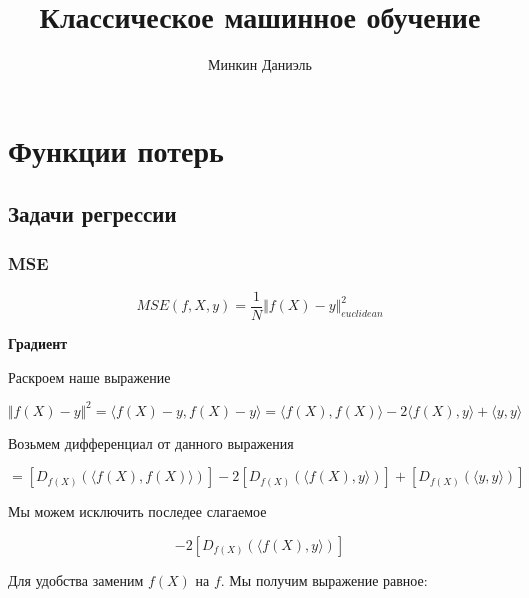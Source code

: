 \documentclass{article}
\title{Классическое машинное обучение}
\author{Минкин Даниэль}
\begin{document}
    \maketitle

    \tableofcontents %

    \section{Функции потерь}

    \subsection{Задачи регрессии}

    \subsubsection{MSE}

    \begin{equation}
        MSE(f, X, y) =  \frac{1}{N} \Vert f(X) -  y \Vert_{euclidean}^{2} 
    \end{equation}

    \quad 

    \textbf{Градиент}

    \quad 

    Раскроем наше выражение

    \begin{equation}
        \Vert f(X) - y \Vert^{2} = \langle f(X) - y, f(X) - y \rangle = \langle f(X), f(X)  \rangle - 2 \langle f(X), y  \rangle + \langle y, y  \rangle
    \end{equation}

    Возьмем дифференциал от данного выражения 

    \begin{equation}
        [D_{f(X)} (\Vert f(X) - y \Vert)] = [D_{f(X)} (\langle f(X), f(X)  \rangle)] - 2 [D_{f(X)} (\langle f(X), y  \rangle)] + [D_{f(X)} (\langle y, y  \rangle)]
    \end{equation}

    Мы можем исключить последее слагаемое

    \begin{equation}
        [D_{f(X)} (\langle f(X), f(X)  \rangle)] - 2 [D_{f(X)} (\langle f(X), y  \rangle)] 
    \end{equation}

    Для удобства заменим $f(X)$ на $f$. Мы получим выражение равное: 
\end{document}
